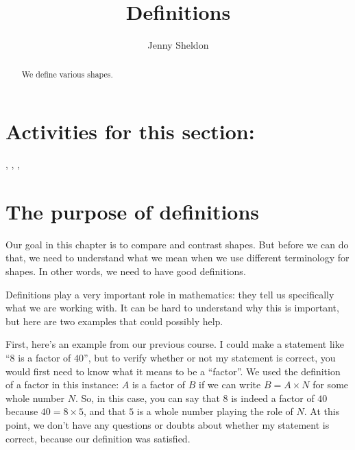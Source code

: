 \documentclass{ximera}
\title{Definitions}
\author{Jenny Sheldon}
\begin{document}
\begin{abstract}
We define various shapes.
\end{abstract}
\maketitle

\section{Activities for this section:} 
, 
, 
, 



\section{The purpose of definitions}

Our goal in this chapter is to compare and contrast shapes. But before we can do that, we need to understand what we mean when we use different terminology for shapes. In other words, we need to have good definitions.

Definitions play a very important role in mathematics: they tell us specifically what we are working with. It can be hard to understand why this is important, but here are two examples that could possibly help.

First, here's an example from our previous course. I could make a statement like ``$8$ is a factor of $40$'', but to verify whether or not my statement is correct, you would first need to know what it means to be a ``factor''. We used the definition of a factor in this instance: $A$ is a factor of $B$ if we can write $B = A \times N$ for some whole number $N$. So, in this case, you can say that $8$ is indeed a factor of $40$ because $40 = 8 \times 5$, and that $5$ is a whole number playing the role of $N$. At this point, we don't have any questions or doubts about whether my statement is correct, because our definition was satisfied.
\end{document}
